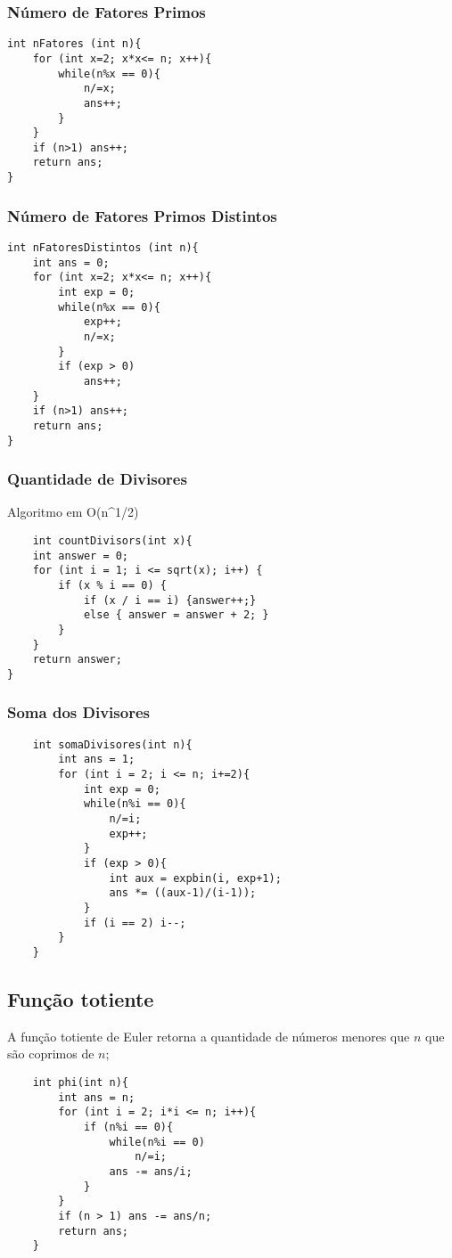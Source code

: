 \subsubsection{Número de Fatores Primos}
\begin{verbatim}
int nFatores (int n){
    for (int x=2; x*x<= n; x++){
        while(n%x == 0){
            n/=x;
            ans++;
        }
    }
    if (n>1) ans++;
    return ans;
}
\end{verbatim}

\subsubsection{Número de Fatores Primos Distintos}
\begin{verbatim}
int nFatoresDistintos (int n){
    int ans = 0;
    for (int x=2; x*x<= n; x++){
        int exp = 0;
        while(n%x == 0){
            exp++;
            n/=x;
        }
        if (exp > 0)
            ans++;
    }
    if (n>1) ans++;
    return ans;
}
\end{verbatim}
\subsubsection{Quantidade de Divisores}
Algoritmo em O(n^1/2)
\begin{verbatim}
    int countDivisors(int x){ 
    int answer = 0; 
    for (int i = 1; i <= sqrt(x); i++) { 
        if (x % i == 0) { 
            if (x / i == i) {answer++;}        
            else { answer = answer + 2; }   
        } 
    } 
    return answer; 
} 

\end{verbatim}
\subsubsection{Soma dos Divisores}
\begin{verbatim}
    int somaDivisores(int n){
        int ans = 1;
        for (int i = 2; i <= n; i+=2){
            int exp = 0;
            while(n%i == 0){
                n/=i;
                exp++;
            }
            if (exp > 0){
                int aux = expbin(i, exp+1);
                ans *= ((aux-1)/(i-1));
            }
            if (i == 2) i--;
        }
    }
\end{verbatim}

\subsection{Função totiente}
A função totiente de Euler retorna a quantidade de números menores que $n$ que são coprimos de $n$;
\begin{verbatim}
    int phi(int n){
        int ans = n;
        for (int i = 2; i*i <= n; i++){
            if (n%i == 0){
                while(n%i == 0)
                    n/=i;
                ans -= ans/i;
            }
        }
        if (n > 1) ans -= ans/n;
        return ans;
    }
\end{verbatim}
